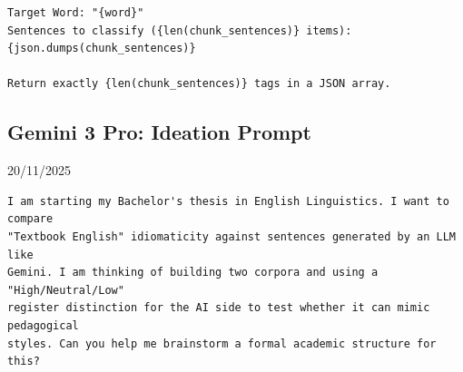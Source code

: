 \documentclass[11pt,a4paper]{article}
\begin{document}
\begin{lstlisting}
Target Word: "{word}"
Sentences to classify ({len(chunk_sentences)} items):
{json.dumps(chunk_sentences)}

Return exactly {len(chunk_sentences)} tags in a JSON array.
\end{lstlisting}

\subsection{Gemini 3 Pro: Ideation Prompt}\label{subsec:ai-ideation-prompt}
 20/11/2025

\begin{lstlisting}
I am starting my Bachelor's thesis in English Linguistics. I want to compare
"Textbook English" idiomaticity against sentences generated by an LLM like
Gemini. I am thinking of building two corpora and using a "High/Neutral/Low"
register distinction for the AI side to test whether it can mimic pedagogical
styles. Can you help me brainstorm a formal academic structure for this?
\end{lstlisting}
\end{document}

